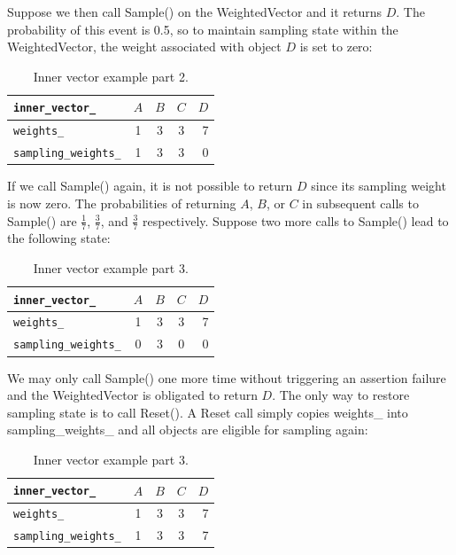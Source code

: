 \documentclass[12pt]{article}
\begin{document}
    Suppose we then call Sample() on the WeightedVector and it returns $D$. The
    probability of this event is 0.5, so to maintain sampling state within the
    WeightedVector, the weight associated with object $D$ is set to zero:

    \begin{table}[htbp]
      \caption{Inner vector example part 2.}
      \begin{center}
      \begin{tabular}{ | l | c | c | c | r | }
        \hline
        \verb|inner_vector_| & $A$ & $B$ & $C$ & $D$ \\ \hline
        \verb|weights_| & 1 & 3 & 3 & 7 \\ \hline
        \verb|sampling_weights_| & 1 & 3 & 3 & 0 \\ \hline
        \hline
      \end{tabular}
      \end{center}
    \end{table}

    If we call Sample() again, it is not possible to return $D$ since its
    sampling weight is now zero. The probabilities of returning $A$, $B$, or
    $C$ in subsequent calls to Sample() are $\frac{1}{7}$, $\frac{3}{7}$, and
    $\frac{3}{7}$ respectively. Suppose two more calls to Sample() lead to the
    following state:

    \begin{table}[htbp]
      \caption{Inner vector example part 3.}
      \begin{center}
      \begin{tabular}{ | l | c | c | c | r | }
        \hline
        \verb|inner_vector_| & $A$ & $B$ & $C$ & $D$ \\ \hline
        \verb|weights_| & 1 & 3 & 3 & 7 \\ \hline
        \verb|sampling_weights_| & 0 & 3 & 0 & 0 \\ \hline
        \hline
      \end{tabular}
      \end{center}
    \end{table}

    We may only call Sample() one more time without triggering an assertion
    failure and the WeightedVector is obligated to return $D$. The only way to
    restore sampling state is to call Reset(). A Reset call simply copies
    weights\_ into sampling\_weights\_ and all objects are eligible for
    sampling again:

    \begin{table}[htbp]
      \caption{Inner vector example part 3.}
      \begin{center}
      \begin{tabular}{ | l | c | c | c | r | }
        \hline
        \verb|inner_vector_| & $A$ & $B$ & $C$ & $D$ \\ \hline
        \verb|weights_| & 1 & 3 & 3 & 7 \\ \hline
        \verb|sampling_weights_| & 1 & 3 & 3 & 7 \\ \hline
        \hline
      \end{tabular}
      \end{center}
    \end{table}
\end{document}
